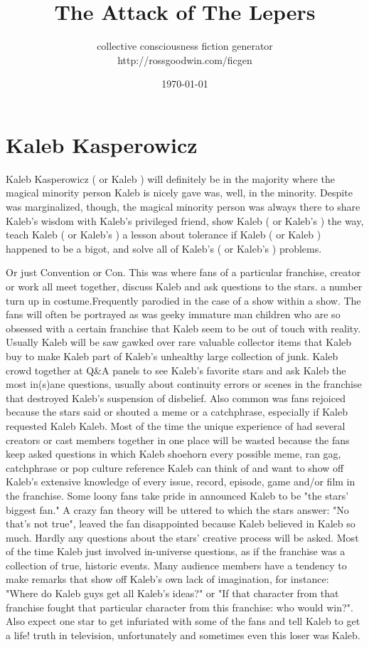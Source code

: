 \documentclass[12pt]{book}
\title{The Attack of The Lepers}
\author{collective consciousness fiction generator\\http://rossgoodwin.com/ficgen}
\date{\today}
\begin{document}
\maketitle



\chapter{Kaleb Kasperowicz}

Kaleb Kasperowicz ( or Kaleb ) will definitely be in the majority where the magical minority person Kaleb is nicely gave was, well, in the minority. Despite was marginalized, though, the magical minority person was always there to share Kaleb's wisdom with Kaleb's privileged friend, show Kaleb ( or Kaleb's ) the way, teach Kaleb ( or Kaleb's ) a lesson about tolerance if Kaleb ( or Kaleb ) happened to be a bigot, and solve all of Kaleb's ( or Kaleb's ) problems.



Or just Convention or Con. This was where fans of a particular franchise, creator or work all meet together, discuss Kaleb and ask questions to the stars. a number turn up in costume.Frequently parodied in the case of a show within a show. The fans will often be portrayed as was geeky immature man children who are so obsessed with a certain franchise that Kaleb seem to be out of touch with reality. Usually Kaleb will be saw gawked over rare valuable collector items that Kaleb buy to make Kaleb part of Kaleb's unhealthy large collection of junk. Kaleb crowd together at Q\&A panels to see Kaleb's favorite stars and ask Kaleb the most in(s)ane questions, usually about continuity errors or scenes in the franchise that destroyed Kaleb's suspension of disbelief. Also common was fans rejoiced because the stars said or shouted a meme or a catchphrase, especially if Kaleb requested Kaleb Kaleb. Most of the time the unique experience of had several creators or cast members together in one place will be wasted because the fans keep asked questions in which Kaleb shoehorn every possible meme, ran gag, catchphrase or pop culture reference Kaleb can think of and want to show off Kaleb's extensive knowledge of every issue, record, episode, game and/or film in the franchise. Some loony fans take pride in announced Kaleb to be "the stars' biggest fan." A crazy fan theory will be uttered to which the stars answer: "No that's not true", leaved the fan disappointed because Kaleb believed in Kaleb so much. Hardly any questions about the stars' creative process will be asked. Most of the time Kaleb just involved in-universe questions, as if the franchise was a collection of true, historic events. Many audience members have a tendency to make remarks that show off Kaleb's own lack of imagination, for instance: "Where do Kaleb guys get all Kaleb's ideas?" or "If that character from that franchise fought that particular character from this franchise: who would win?". Also expect one star to get infuriated with some of the fans and tell Kaleb to get a life! truth in television, unfortunately and sometimes even this loser was Kaleb.
\end{document}
